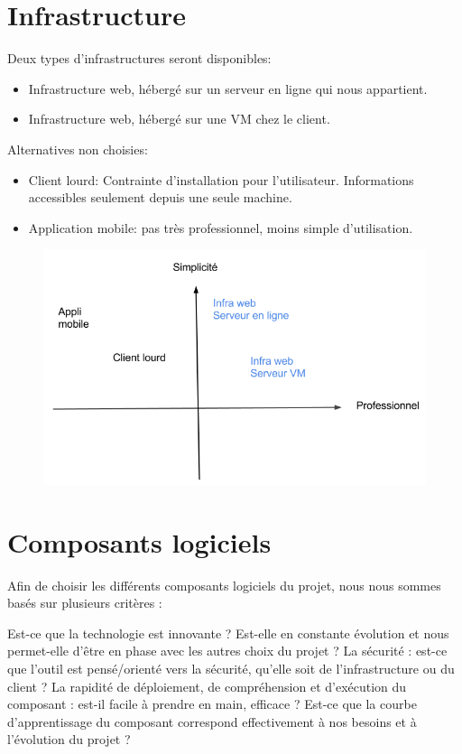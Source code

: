 \section{Infrastructure}
Deux types d'infrastructures seront disponibles:
\begin{itemize}
\item Infrastructure web, hébergé sur un serveur en ligne qui nous appartient.
\item Infrastructure web, hébergé sur une VM chez le client.\\
\end{itemize}

Alternatives non choisies:
\begin{itemize}
\item Client lourd: Contrainte d'installation pour l'utilisateur. Informations accessibles seulement depuis une seule machine.
\item Application mobile: pas très professionnel, moins simple d'utilisation.
\end{itemize}

\begin{figure}[!h]
  \includegraphics[width=18cm]{choix-infra.png}
\end{figure}

\newpage


\section{Composants logiciels}
Afin de choisir les différents composants logiciels du projet, nous nous sommes basés sur plusieurs critères :

Est-ce que la technologie est innovante ? Est-elle en constante évolution et nous permet-elle d'être en phase avec les autres choix du projet ?
La sécurité : est-ce que l'outil est pensé/orienté vers la sécurité, qu'elle soit de l'infrastructure ou du client ?
La rapidité de déploiement, de compréhension et d'exécution du composant : est-il facile à prendre en main, efficace ? Est-ce que la courbe d'apprentissage du composant correspond effectivement à nos besoins et à l'évolution du projet ?

